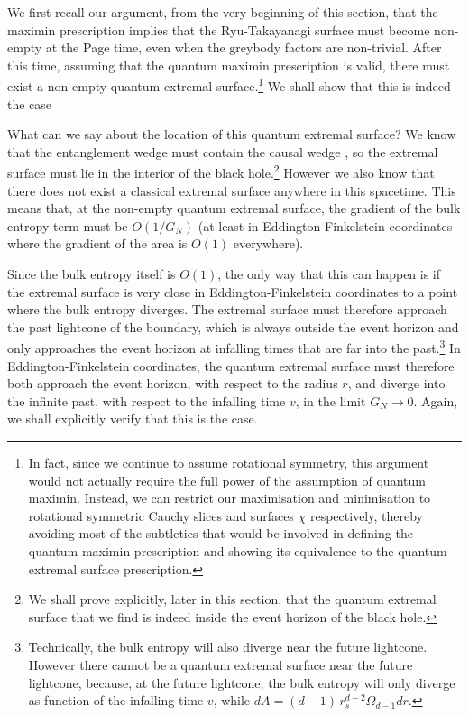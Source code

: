 \documentclass[11pt,a4paper]{article}
\begin{document}
We first recall our argument, from the very beginning of this section, that the maximin prescription implies that the Ryu-Takayanagi surface must become non-empty at the Page time, even when the greybody factors are non-trivial. After this time, assuming that the quantum maximin prescription is valid, there must exist a non-empty quantum extremal surface.\footnote{In fact, since we continue to assume rotational symmetry, this argument would not actually require the full power of the assumption of quantum maximin. Instead, we can restrict our maximisation and minimisation to rotational symmetric Cauchy slices and surfaces $\chi$ respectively, thereby avoiding most of the subtleties that would be involved in defining the quantum maximin prescription and showing its equivalence to the quantum extremal surface prescription.} We shall show that this is indeed the case

What can we say about the location of this quantum extremal surface? We know that the entanglement wedge must contain the causal wedge \cite{engelhardt2015quantum}, so the extremal surface must lie in the interior of the black hole.\footnote{We shall prove explicitly, later in this section, that the quantum extremal surface that we find is indeed inside the event horizon of the black hole.} However we also know that there does not exist a classical extremal surface anywhere in this spacetime. This means that, at the non-empty quantum extremal surface, the gradient of the bulk entropy term must be $O(1/G_N)$ (at least in Eddington-Finkelstein coordinates where the gradient of the area is $O(1)$ everywhere). 

Since the bulk entropy itself is $O(1)$, the only way that this can happen is if the extremal surface is very close in Eddington-Finkelstein coordinates to a point where the bulk entropy diverges. The extremal surface must therefore approach the past lightcone of the boundary, which is always outside the event horizon and only approaches the event horizon at infalling times that are far into the past.\footnote{Technically, the bulk entropy will also diverge near the future lightcone. However there cannot be a quantum extremal surface near the future lightcone, because, at the future lightcone, the bulk entropy will only diverge as function of the infalling time $v$, while $dA = (d-1)\, r_s^{d-2} \Omega_{d-1} dr$.} In Eddington-Finkelstein coordinates, the quantum extremal surface must therefore both approach the event horizon, with respect to the radius $r$, and diverge into the infinite past, with respect to the infalling time $v$, in the limit $G_N \to 0$. Again, we shall explicitly verify that this is the case. 
\end{document}
